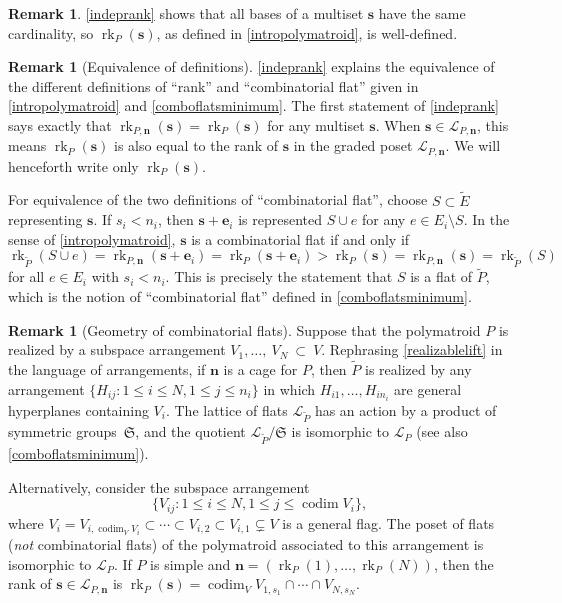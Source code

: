 \documentclass[11pt]{article}
\theoremstyle{definition}
\newtheorem{rema}[theo]{Remark}
\numberwithin{equation}{section}
\DeclareMathOperator{\rk}{rk}
\DeclareMathOperator{\codim}{codim}
\begin{document}
\begin{rema}\label{welldfndrk}
  \cref{indeprank} shows that all bases of a multiset $\mathbf s$ have the same cardinality, so $\rk_P(\mathbf s)$, as defined in \cref{intropolymatroid}, is well-defined.
\end{rema}
\begin{rema}[Equivalence of definitions]\label{equivalence}
  \cref{indeprank} explains the equivalence of the different definitions of ``rank'' and ``combinatorial flat'' given in \cref{intropolymatroid} and \cref{comboflatsminimum}.
  The first statement of \cref{indeprank} says exactly that $\rk_{P, \mathbf n}(\mathbf s) = \rk_P(\mathbf s)$ for any multiset $\mathbf s$. When $\mathbf s \in \mathcal L_{P, \mathbf n}$, this means $\rk_P(\mathbf s)$ is also equal to the rank of $\mathbf s$ in the graded poset $\mathcal L_{P, \mathbf n}$.
  We will henceforth write only $\rk_P(\mathbf s)$.

  For equivalence of the two definitions of ``combinatorial flat'', choose $S \subset \widetilde E$ representing $\mathbf s$.
  If $s_i < n_i$, then $\mathbf s + \mathbf e_i$ is represented $S \cup e$ for any $e \in E_i \setminus S$.
  In the sense of \cref{intropolymatroid}, $\mathbf s$ is a combinatorial flat if and only if
  \[
    \rk_{\widetilde P}(S \cup e) = \rk_{P, \mathbf n}(\mathbf s + \mathbf e_i) = \rk_P(\mathbf s + \mathbf e_i)  > \rk_P(\mathbf s) = \rk_{P, \mathbf n}(\mathbf s) = \rk_{\widetilde P}(S)
  \]
  for all $e \in E_i$ with $s_i < n_i$.
  This is precisely the statement that $S$ is a flat of $\widetilde P$, which is the notion of ``combinatorial flat'' defined in \cref{comboflatsminimum}.
\end{rema}
\begin{rema}[Geometry of combinatorial flats]\label{geometryofcf}
  Suppose that the polymatroid $P$ is realized by a subspace arrangement $V_1, \ldots,~V_N~\subset~V$.
  Rephrasing \cref{realizablelift} in the language of arrangements, if $\mathbf n$ is a cage for $P$, then $\widetilde P$ is realized by any arrangement $\{H_{ij} : 1 \leq i \leq N, 1 \leq j \leq n_i\}$ in which $H_{i1},\ldots, H_{in_i}$ are general hyperplanes containing $V_i$.
  The lattice of flats $\mathcal L_{\widetilde P}$ has an action by a product of symmetric groups~$\mathfrak S$, and the quotient $\mathcal L_{\widetilde P} / \mathfrak S$ is isomorphic to $\mathcal L_P$ (see also \cref{comboflatsminimum}).

  Alternatively, consider the subspace arrangement 
  \[
  \{V_{ij} : 1 \leq i \leq N, 1 \leq j \leq \codim V_i\},
  \]
  where $V_i = V_{i,\codim_V V_i} \subset \cdots \subset V_{i,2} \subset V_{i,1} \subsetneq V$ is a general flag.
  The poset of flats (\emph{not} combinatorial flats) of the polymatroid associated to this arrangement is isomorphic to $\mathcal L_P$. If $P$ is simple and $\mathbf n = (\rk_P(1), \ldots, \rk_P(N))$, then the rank of $\mathbf s \in \mathcal L_{P, \mathbf n}$ is $\rk_P(\mathbf s) = \codim_V V_{1,s_1} \cap \cdots \cap V_{N, s_N}$.
\end{rema}
\end{document}
